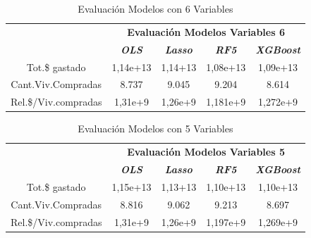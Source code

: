 \documentclass[conference, 10pt]{IEEEtran}
\begin{document}
\begin{table}[htbp]
\caption{Evaluación Modelos con 6 Variables}
\begin{center}
\begin{tabular}{|c|c|c|c|c|}
\hline
&\multicolumn{4}{|c|}{\textbf{Evaluación Modelos Variables 6}} \\
\cline{2-5} 
& \textbf{\textit{OLS}}& \textbf{\textit{Lasso}}& \textbf{\textit{RF5}}& \textbf{\textit{XGBoost}} \\
\hline
Tot.\$ gastado& 1,14e+13& 1,14+13& 1,08e+13& 1,09e+13 \\
\hline
Cant.Viv.Compradas& 8.737& 9.045& 9.204& 8.614 \\
\hline
Rel.\$/Viv.compradas& 1,31e+9& 1,26e+9& 1,181e+9& 1,272e+9 \\

\hline
\end{tabular}
\label{tab_12}
\end{center}
\end{table}

\begin{table}[htbp]
\caption{Evaluación Modelos con 5 Variables}
\begin{center}
\begin{tabular}{|c|c|c|c|c|}
\hline
&\multicolumn{4}{|c|}{\textbf{Evaluación Modelos Variables 5}} \\
\cline{2-5} 
& \textbf{\textit{OLS}}& \textbf{\textit{Lasso}}& \textbf{\textit{RF5}}& \textbf{\textit{XGBoost}} \\
\hline
Tot.\$ gastado& 1,15e+13& 1,13+13& 1,10e+13& 1,10e+13 \\
\hline
Cant.Viv.Compradas& 8.816& 9.062& 9.213& 8.697 \\
\hline
Rel.\$/Viv.compradas& 1,31e+9& 1,26e+9& 1,197e+9& 1,269e+9 \\

\hline
\end{tabular}
\label{tab_13}
\end{center}
\end{table}
\end{document}
